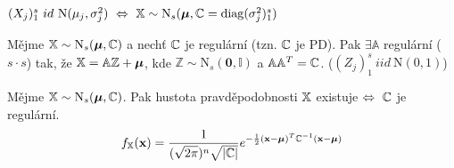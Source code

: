 \begin{dusl}
	$(X_j)_1^s~id~\mathrm{N}(\mu_j,\sigma_j^2)~\Leftrightarrow~\mathbb{X}\sim\mathrm{N}_s(\boldsymbol{\mu},\mathbb{C}=\mathop{\mathrm{diag}}(\sigma_j^2)_1^s)$
\end{dusl}
\begin{theorem}
	Mějme $\mathbb{X}\sim\mathrm{N}_s(\boldsymbol{\mu},\mathbb{C})$ a nechť $\mathbb{C}$ je regulární (tzn. $\mathbb{C}$ je PD). Pak $\exists\mathbb{A}$ regulární ($s\cdot s$) tak, že $\mathbb{X}=\mathbb{A}\mathbb{Z}+\boldsymbol{\mu}$, kde $\mathbb{Z}\sim\mathrm{N}_s(\textbf{0},\mathbb{I})$ a $\mathbb{A}\mathbb{A}^T=\mathbb{C}$. ($(Z_j)_1^s~iid~\mathrm{N}(0,1)$)
\end{theorem}
\begin{theorem}
	Mějme $\mathbb{X}\sim\mathrm{N}_s(\boldsymbol{\mu},\mathbb{C})$. Pak hustota pravděpodobnosti $\mathbb{X}$ existuje $\Leftrightarrow~\mathbb{C}$ je regulární.
	$$ f_{\mathbb{X}}(\textbf{x})=\frac{1}{(\sqrt{2\pi})^n\sqrt{|\mathbb{C}|}}e^{-\frac{1}{2}(\textbf{x}-\boldsymbol{\mu})^T\mathbb{C}^{-1}(\textbf{x}-\boldsymbol{\mu})} $$ 
\end{theorem}